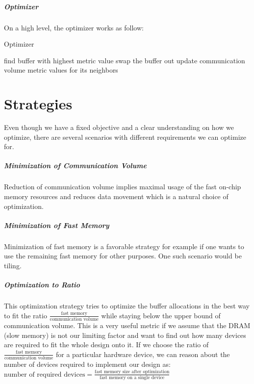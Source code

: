 \subparagraph{Optimizer}
On a high level, the optimizer works as follow:
\begin{algorithm}
	\caption{Optimizer}
	\begin{algorithmic}
		\STATE find buffer with highest metric value
		\STATE swap the buffer out
		\STATE update communication volume metric values for 
		\STATE its neighbors 
		\ENDWHILE
	\end{algorithmic}
\end{algorithm}


\section{Strategies}
Even though we have a fixed objective and a clear understanding on how we optimize, there are several scenarios with different requirements we can optimize for. 


\subparagraph{Minimization of Communication Volume}
Reduction of communication volume implies maximal usage of the fast on-chip memory resources and reduces data movement which is a natural choice of optimization.


\subparagraph{Minimization of Fast Memory}
Minimization of fast memory is a favorable strategy for example if one wants to use the remaining fast memory for other purposes. One such scenario would be tiling. 


\subparagraph{Optimization to Ratio}
This optimization strategy tries to optimize the buffer allocations in the best way to fit the ratio $\frac{\textrm{fast memory}}{\textrm{communication volume}}$ while staying below the upper bound of communication volume. This is a very useful metric if we assume that the DRAM (slow memory) is not our limiting factor and want to find out how many devices are required to fit the whole design onto it. If we choose the ratio of $\frac{\textrm{fast memory}}{\textrm{communication volume}}$ for a particular hardware device, we can reason about the number of devices required to implement our design as: $\textrm{number of required devices} = \frac{\textrm{fast memory size after optimization}}{\textrm{fast memory on a single device}}$
